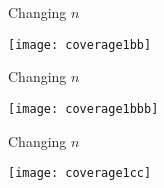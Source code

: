 \documentclass[xcolor=dvipsnames]{beamer}
\begin{document}
\begin{frame}{Changing $n$}
\begin{center}
	\texttt{[image: coverage1bb]}
\end{center}
\end{frame}

\begin{frame}{Changing $n$}
\begin{center}
	\texttt{[image: coverage1bbb]}
\end{center}
\end{frame}

\begin{frame}{Changing $n$}
\begin{center}
	\texttt{[image: coverage1cc]}
\end{center}
\end{frame}
\end{document}
